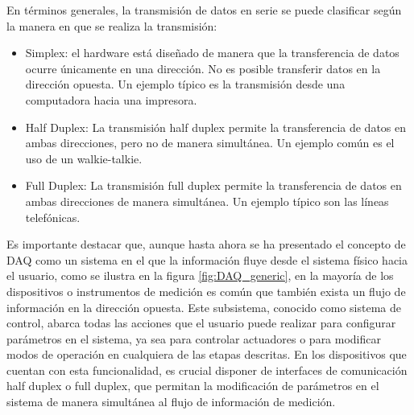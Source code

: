 \documentclass{report}
\begin{document}
\noindent En términos generales, la transmisión de datos en serie se puede clasificar según la manera en que se realiza la transmisión:
 \begin{itemize}
    \item Simplex: el hardware está diseñado de manera que la transferencia de datos ocurre únicamente en una dirección. No es posible transferir datos en la dirección opuesta. Un ejemplo típico es la transmisión desde una computadora hacia una impresora.
    \item Half Duplex: La transmisión half duplex permite la transferencia de datos en ambas direcciones, pero no de manera simultánea. Un ejemplo común es el uso de un walkie-talkie.
    \item Full Duplex: La transmisión full duplex permite la transferencia de datos en ambas direcciones de manera simultánea. Un ejemplo típico son las líneas telefónicas.
 \end{itemize}

 \noindent Es importante destacar que, aunque hasta ahora se ha presentado el concepto de DAQ como un sistema en el que la información fluye desde el sistema físico hacia el usuario, como se ilustra en la figura \ref{fig:DAQ_generic}, en la mayoría de los dispositivos o instrumentos de medición es común que también exista un flujo de información en la dirección opuesta. Este subsistema, conocido como sistema de control, abarca todas las acciones que el usuario puede realizar para configurar parámetros en el sistema, ya sea para controlar actuadores o para modificar modos de operación en cualquiera de las etapas descritas. En los dispositivos que cuentan con esta funcionalidad, es crucial disponer de interfaces de comunicación half duplex o full duplex, que permitan la modificación de parámetros en el sistema de manera simultánea al flujo de información de medición.\\
\end{document}
